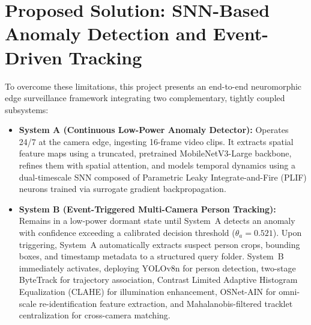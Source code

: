 \documentclass[12pt,a4paper]{report}
\begin{document}
\section{Proposed Solution: SNN-Based Anomaly Detection and Event-Driven Tracking}
To overcome these limitations, this project presents an end-to-end neuromorphic edge surveillance framework integrating two complementary, tightly coupled subsystems:
\begin{itemize}
    \item \textbf{System A (Continuous Low-Power Anomaly Detector):} Operates 24/7 at the camera edge, ingesting 16-frame video clips. It extracts spatial feature maps using a truncated, pretrained MobileNetV3-Large backbone, refines them with spatial attention, and models temporal dynamics using a dual-timescale SNN composed of Parametric Leaky Integrate-and-Fire (PLIF) neurons trained via surrogate gradient backpropagation.
    \item \textbf{System B (Event-Triggered Multi-Camera Person Tracking):} Remains in a low-power dormant state until System~A detects an anomaly with confidence exceeding a calibrated decision threshold ($\theta_a = 0.521$). Upon triggering, System~A automatically extracts suspect person crops, bounding boxes, and timestamp metadata to a structured query folder. System~B immediately activates, deploying YOLOv8n for person detection, two-stage ByteTrack for trajectory association, Contrast Limited Adaptive Histogram Equalization (CLAHE) for illumination enhancement, OSNet-AIN for omni-scale re-identification feature extraction, and Mahalanobis-filtered tracklet centralization for cross-camera matching.
\end{itemize}
\end{document}
